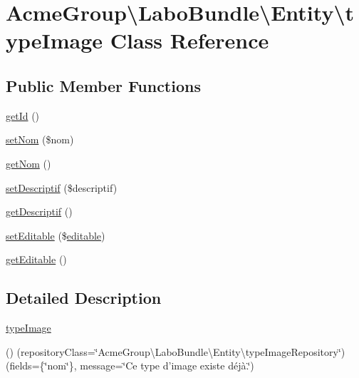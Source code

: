\hypertarget{class_acme_group_1_1_labo_bundle_1_1_entity_1_1type_image}{\section{Acme\+Group\textbackslash{}Labo\+Bundle\textbackslash{}Entity\textbackslash{}type\+Image Class Reference}
\label{class_acme_group_1_1_labo_bundle_1_1_entity_1_1type_image}
}
\subsection*{Public Member Functions}
\begin{DoxyCompactItemize}
\item 
\hyperlink{class_acme_group_1_1_labo_bundle_1_1_entity_1_1type_image_a5d0ac8e35dc8690447e6a548d0144adf}{get\+Id} ()
\item 
\hyperlink{class_acme_group_1_1_labo_bundle_1_1_entity_1_1type_image_aeb08cbeaa4021a19eadac2b568cb199c}{set\+Nom} (\$nom)
\item 
\hyperlink{class_acme_group_1_1_labo_bundle_1_1_entity_1_1type_image_a15695bc8abafff54b5ac947e13349d17}{get\+Nom} ()
\item 
\hyperlink{class_acme_group_1_1_labo_bundle_1_1_entity_1_1type_image_ae175b11edc65f3666b954fcaa2574441}{set\+Descriptif} (\$descriptif)
\item 
\hyperlink{class_acme_group_1_1_labo_bundle_1_1_entity_1_1type_image_ae71660a497475c24f48bc19fb9e4834f}{get\+Descriptif} ()
\item 
\hyperlink{class_acme_group_1_1_labo_bundle_1_1_entity_1_1type_image_a86ed27f91141f7e85f56b1d96d4ca949}{set\+Editable} (\$\hyperlink{jquery_8jeditable_8js_a855cab08850661d0cbdf684f654b50f2}{editable})
\item 
\hyperlink{class_acme_group_1_1_labo_bundle_1_1_entity_1_1type_image_aabb936e12084e726d13a158e90f6d218}{get\+Editable} ()
\end{DoxyCompactItemize}


\subsection{Detailed Description}
\hyperlink{class_acme_group_1_1_labo_bundle_1_1_entity_1_1type_image}{type\+Image}

() (repository\+Class=\char`\"{}\+Acme\+Group\textbackslash{}\+Labo\+Bundle\textbackslash{}\+Entity\textbackslash{}type\+Image\+Repository\char`\"{}) (fields=\{\char`\"{}nom\char`\"{}\}, message=\char`\"{}\+Ce type d'image existe déjà.\char`\"{}) 

